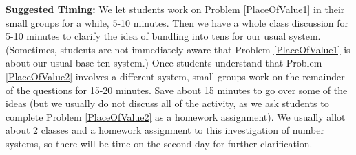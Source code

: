 \documentclass{ximera}
\begin{document}
\begin{instructorNotes}
{\bf Suggested Timing:} We let students work on Problem \ref{PlaceOfValue1} in their small groups for a while, 5-10 minutes.  Then we have a whole class discussion for 5-10 minutes to clarify the idea of bundling into tens for our usual system. (Sometimes, students are not immediately aware that Problem \ref{PlaceOfValue1} is about our usual base ten system.) Once students understand that Problem \ref{PlaceOfValue2} involves a different system, small groups work on the remainder of the questions for 15-20 minutes.  Save about 15 minutes to go over some of the ideas (but we usually do not discuss all of the activity, as we ask students to complete Problem \ref{PlaceOfValue2} as a homework assignment).  We usually allot about 2 classes and a homework assignment to this investigation of number systems, so there will be time on the second day for further clarification.

\end{instructorNotes}
\end{document}

